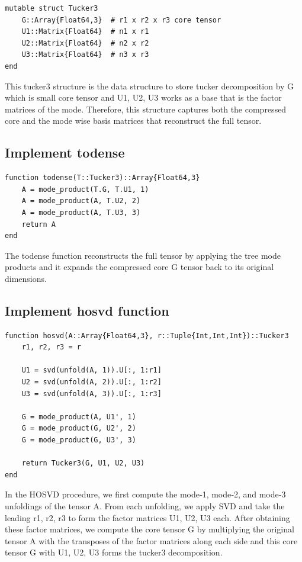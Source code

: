 \documentclass[11pt]{report}
\begin{document}
\begin{lstlisting}
mutable struct Tucker3
    G::Array{Float64,3}  # r1 x r2 x r3 core tensor
    U1::Matrix{Float64}  # n1 x r1
    U2::Matrix{Float64}  # n2 x r2
    U3::Matrix{Float64}  # n3 x r3
end
\end{lstlisting}

This tucker3 structure is the data structure to store tucker decomposition by G which is small core tensor and U1, U2, U3 works as a base that is the factor matrices of the mode. 
Therefore, this structure captures both the compressed core and the mode wise basis matrices that reconstruct the full tensor.

\subsection{Implement todense}

\begin{lstlisting}
function todense(T::Tucker3)::Array{Float64,3}
    A = mode_product(T.G, T.U1, 1)
    A = mode_product(A, T.U2, 2)
    A = mode_product(A, T.U3, 3)
    return A
end
\end{lstlisting}

The todense function reconstructs the full tensor by applying the tree mode products and it expands the compressed core G tensor back to its original dimensions.

\subsection{Implement hosvd function}

\begin{lstlisting}
function hosvd(A::Array{Float64,3}, r::Tuple{Int,Int,Int})::Tucker3
    r1, r2, r3 = r

    U1 = svd(unfold(A, 1)).U[:, 1:r1]
    U2 = svd(unfold(A, 2)).U[:, 1:r2]
    U3 = svd(unfold(A, 3)).U[:, 1:r3]

    G = mode_product(A, U1', 1)
    G = mode_product(G, U2', 2)
    G = mode_product(G, U3', 3)

    return Tucker3(G, U1, U2, U3)
end
\end{lstlisting}

In the HOSVD procedure, we first compute the mode‑1, mode‑2, and mode‑3 unfoldings of the tensor A. From each unfolding, we apply SVD and take the leading r1, r2, r3 to form the factor matrices U1, U2, U3 each. After obtaining these factor matrices, we compute the core tensor G by multiplying the original tensor A with the transposes of the factor matrices along each side and this core tensor G with U1, U2, U3 forms the tucker3 decomposition.
\end{document}
